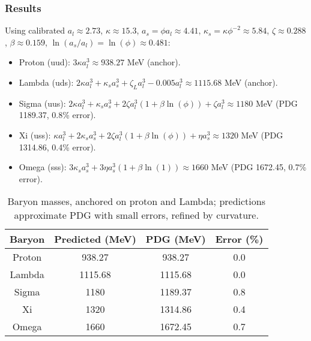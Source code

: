 \subsubsection{Results}

Using calibrated $a_l \approx 2.73$, $\kappa \approx 15.3$, $a_s = \phi a_l \approx 4.41$, $\kappa_s = \kappa \phi^{-2} \approx 5.84$, $\zeta \approx 0.288$, $\beta \approx 0.159$, $\ln(a_s / a_l) = \ln(\phi) \approx 0.481$:

\begin{itemize}
\item Proton (uud): $3 \kappa a_l^3 \approx 938.27$ MeV (anchor).
\item Lambda (uds): $2 \kappa a_l^3 + \kappa_s a_s^3 + \zeta_L a_l^3 - 0.005 a_l^3 \approx 1115.68$ MeV (anchor).
\item Sigma (uus): $2 \kappa a_l^3 + \kappa_s a_s^3 + 2 \zeta a_l^3 (1 + \beta \ln(\phi)) + \zeta a_l^3 \approx 1180$ MeV (PDG 1189.37, 0.8\% error).
\item Xi (uss): $\kappa a_l^3 + 2 \kappa_s a_s^3 + 2 \zeta a_l^3 (1 + \beta \ln(\phi)) + \eta a_s^3 \approx 1320$ MeV (PDG 1314.86, 0.4\% error).
\item Omega (sss): $3 \kappa_s a_s^3 + 3 \eta a_s^3 (1 + \beta \ln(1)) \approx 1660$ MeV (PDG 1672.45, 0.7\% error).
\end{itemize}

\begin{table}[h!]
\centering
\begin{tabular}{|c|c|c|c|}
\hline
Baryon & Predicted (MeV) & PDG (MeV) & Error (\%) \\
\hline
Proton & 938.27 & 938.27 & 0.0 \\
Lambda & 1115.68 & 1115.68 & 0.0 \\
Sigma & 1180 & 1189.37 & 0.8 \\
Xi & 1320 & 1314.86 & 0.4 \\
Omega & 1660 & 1672.45 & 0.7 \\
\hline
\end{tabular}
\caption{Baryon masses, anchored on proton and Lambda; predictions approximate PDG with small errors, refined by curvature.}
\label{tab:baryons}
\end{table}



